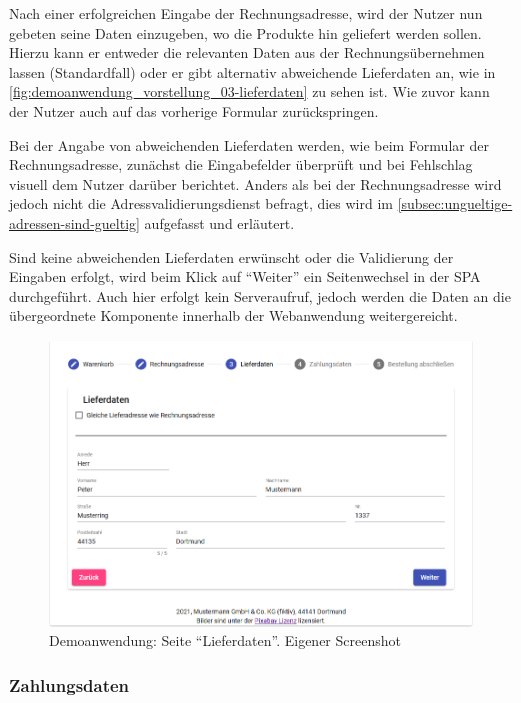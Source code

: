 Nach einer erfolgreichen Eingabe der Rechnungsadresse, wird der Nutzer nun gebeten seine Daten einzugeben, wo die Produkte hin geliefert werden sollen. Hierzu kann er entweder die relevanten Daten aus der Rechnungsübernehmen lassen (Standardfall) oder er gibt alternativ abweichende Lieferdaten an, wie in \autoref{fig:demoanwendung_vorstellung_03-lieferdaten} zu sehen ist. Wie zuvor kann der Nutzer auch auf das vorherige Formular zurückspringen.

Bei der Angabe von abweichenden Lieferdaten werden, wie beim Formular der Rechnungsadresse, zunächst die Eingabefelder überprüft und bei Fehlschlag visuell dem Nutzer darüber berichtet. Anders als bei der Rechnungsadresse wird jedoch nicht die Adressvalidierungsdienst befragt, dies wird im \autoref{subsec:ungueltige-adressen-sind-gueltig} aufgefasst und erläutert.

Sind keine abweichenden Lieferdaten erwünscht oder die Validierung der Eingaben erfolgt, wird beim Klick auf \enquote{Weiter} ein Seitenwechsel in der SPA durchgeführt. Auch hier erfolgt kein Serveraufruf, jedoch werden die Daten an die übergeordnete Komponente innerhalb der Webanwendung weitergereicht.

\begin{figure}[H]
	\centering
	\includegraphics[width=1.00\linewidth]{img/04_erstellung-poc/demoanwendung_vorstellung_03-lieferdaten.png}
	\caption{Demoanwendung: Seite \enquote{Lieferdaten}. Eigener Screenshot}
	\label{fig:demoanwendung_vorstellung_03-lieferdaten}
\end{figure}

\subsubsection{Zahlungsdaten}

